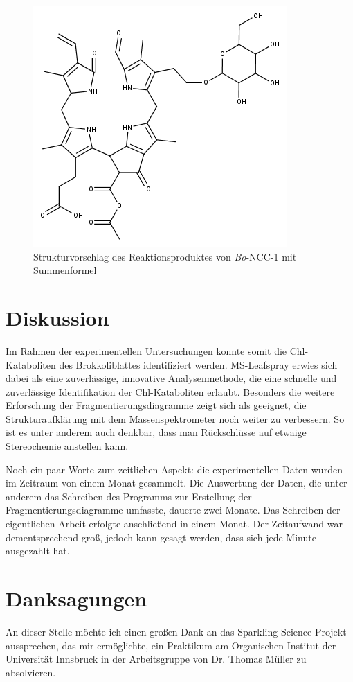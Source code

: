 \documentclass[12pt,a4paper]{article}
\begin{document}
\begin{figure}[htbp]
  \centering
  \includegraphics[scale=0.6]{figures/Kapitel4/Kataboliten/fragmentation_structures/VWA_Katabolit_873.png}
  \caption[Strukturvorschlag des Reaktionsproduktes von \textit{Bo}-NCC-1, Quelle: Autor]{Strukturvorschlag des Reaktionsproduktes von \textit{Bo}-NCC-1 mit Summenformel }
  \label{fig:873MKstructure}
\end{figure}

\pagebreak
\section{Diskussion}

Im Rahmen der experimentellen Untersuchungen konnte somit die Chl-Kataboliten des Brokkoliblattes identifiziert werden. MS-Leafspray erwies sich dabei als eine zuverlässige, innovative Analysenmethode, die eine schnelle und zuverlässige Identifikation der Chl-Kataboliten erlaubt. Besonders die weitere Erforschung der Fragmentierungsdiagramme zeigt sich als geeignet, die Strukturaufklärung mit dem Massenspektrometer noch weiter zu verbessern. So ist es unter anderem auch denkbar, dass man Rückschlüsse auf etwaige Stereochemie anstellen kann.

Noch ein paar Worte zum zeitlichen Aspekt: die experimentellen Daten wurden im Zeitraum von einem Monat gesammelt. Die Auswertung der Daten, die unter anderem das Schreiben des Programms zur Erstellung der Fragmentierungsdiagramme umfasste, dauerte zwei Monate. Das Schreiben der eigentlichen Arbeit erfolgte anschließend in einem Monat. Der Zeitaufwand war dementsprechend groß, jedoch kann gesagt werden, dass sich jede Minute ausgezahlt hat.

\section{Danksagungen}

An dieser Stelle möchte ich einen großen Dank an das Sparkling Science Projekt aussprechen, das mir ermöglichte, ein Praktikum am Organischen Institut der Universität Innsbruck in der Arbeitsgruppe von Dr. Thomas Müller zu absolvieren. 

\printbibliography
\listoffigures
\end{document}
